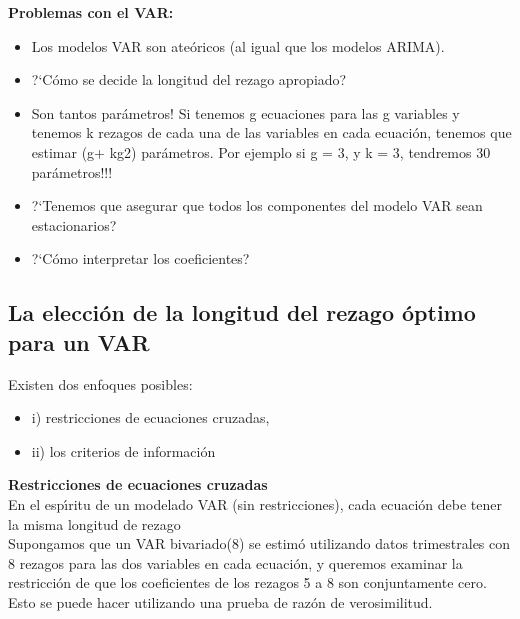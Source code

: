 		\textbf{Problemas con el VAR:}
			\begin{itemize}
				\item Los modelos VAR son ate\'oricos (al igual que los modelos ARIMA).
				\item ?`C\'omo se decide la longitud del rezago apropiado?
				\item Son tantos parámetros! Si tenemos g ecuaciones para las g variables y tenemos k rezagos de cada una de las variables en cada ecuaci\'on, tenemos que estimar (g+ kg2) parámetros. Por ejemplo si g = 3, y k = 3, tendremos 30 par\'ametros!!!
				\item ?`Tenemos que asegurar que todos los componentes del modelo VAR sean estacionarios?
				\item ?`C\'omo interpretar los coeficientes?
			\end{itemize}
		
\subsection{La elecci\'on de la longitud del rezago \'optimo para un VAR}
		
		Existen dos enfoques posibles:\begin{itemize}
			\item i) restricciones de ecuaciones cruzadas,
			\item ii) los criterios de informaci\'on
		\end{itemize}
		
		\textbf{Restricciones de ecuaciones cruzadas}\\
		En el esp\'{\i}ritu de un modelado VAR (sin restricciones), cada ecuaci\'on debe tener la misma longitud de rezago\\
		Supongamos que un VAR bivariado(8) se estim\'o utilizando datos trimestrales con 8 rezagos para las dos variables en cada ecuaci\'on, y queremos examinar la restricci\'on de que los coeficientes de los rezagos 5 a 8 son conjuntamente cero. Esto se puede hacer utilizando una prueba de raz\'on de verosimilitud.\\
		
